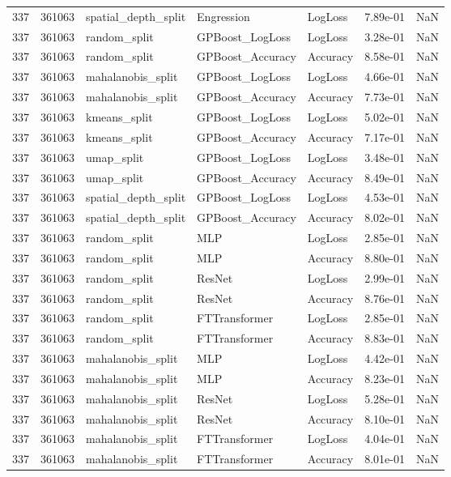 \begin{tabular}{rrlllrr}
337 & 361063 & spatial\_depth\_split & Engression & LogLoss & 7.89e-01 & NaN \\
337 & 361063 & random\_split & GPBoost\_LogLoss & LogLoss & 3.28e-01 & NaN \\
337 & 361063 & random\_split & GPBoost\_Accuracy & Accuracy & 8.58e-01 & NaN \\
337 & 361063 & mahalanobis\_split & GPBoost\_LogLoss & LogLoss & 4.66e-01 & NaN \\
337 & 361063 & mahalanobis\_split & GPBoost\_Accuracy & Accuracy & 7.73e-01 & NaN \\
337 & 361063 & kmeans\_split & GPBoost\_LogLoss & LogLoss & 5.02e-01 & NaN \\
337 & 361063 & kmeans\_split & GPBoost\_Accuracy & Accuracy & 7.17e-01 & NaN \\
337 & 361063 & umap\_split & GPBoost\_LogLoss & LogLoss & 3.48e-01 & NaN \\
337 & 361063 & umap\_split & GPBoost\_Accuracy & Accuracy & 8.49e-01 & NaN \\
337 & 361063 & spatial\_depth\_split & GPBoost\_LogLoss & LogLoss & 4.53e-01 & NaN \\
337 & 361063 & spatial\_depth\_split & GPBoost\_Accuracy & Accuracy & 8.02e-01 & NaN \\
337 & 361063 & random\_split & MLP & LogLoss & 2.85e-01 & NaN \\
337 & 361063 & random\_split & MLP & Accuracy & 8.80e-01 & NaN \\
337 & 361063 & random\_split & ResNet & LogLoss & 2.99e-01 & NaN \\
337 & 361063 & random\_split & ResNet & Accuracy & 8.76e-01 & NaN \\
337 & 361063 & random\_split & FTTransformer & LogLoss & 2.85e-01 & NaN \\
337 & 361063 & random\_split & FTTransformer & Accuracy & 8.83e-01 & NaN \\
337 & 361063 & mahalanobis\_split & MLP & LogLoss & 4.42e-01 & NaN \\
337 & 361063 & mahalanobis\_split & MLP & Accuracy & 8.23e-01 & NaN \\
337 & 361063 & mahalanobis\_split & ResNet & LogLoss & 5.28e-01 & NaN \\
337 & 361063 & mahalanobis\_split & ResNet & Accuracy & 8.10e-01 & NaN \\
337 & 361063 & mahalanobis\_split & FTTransformer & LogLoss & 4.04e-01 & NaN \\
337 & 361063 & mahalanobis\_split & FTTransformer & Accuracy & 8.01e-01 & NaN \\

\end{tabular}
